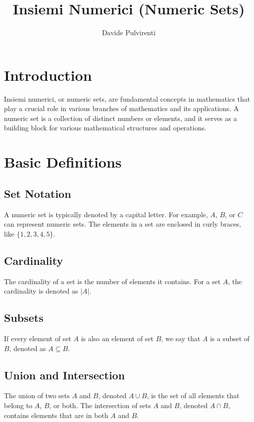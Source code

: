 \documentclass{article}
\title{Insiemi Numerici (Numeric Sets)}
\author{Davide Pulvirenti}
\begin{document}
\maketitle

\tableofcontents

\newpage

\section{Introduction}
Insiemi numerici, or numeric sets, are fundamental concepts in mathematics that play a crucial role in various branches of mathematics and its applications. A numeric set is a collection of distinct numbers or elements, and it serves as a building block for various mathematical structures and operations.

\section{Basic Definitions}
\subsection{Set Notation}
A numeric set is typically denoted by a capital letter. For example, \(A\), \(B\), or \(C\) can represent numeric sets. The elements in a set are enclosed in curly braces, like \(\{1, 2, 3, 4, 5\}\).

\subsection{Cardinality}
The cardinality of a set is the number of elements it contains. For a set \(A\), the cardinality is denoted as \(|A|\).

\subsection{Subsets}
If every element of set \(A\) is also an element of set \(B\), we say that \(A\) is a subset of \(B\), denoted as \(A \subseteq B\).

\subsection{Union and Intersection}
The union of two sets \(A\) and \(B\), denoted \(A \cup B\), is the set of all elements that belong to \(A\), \(B\), or both. The intersection of sets \(A\) and \(B\), denoted \(A \cap B\), contains elements that are in both \(A\) and \(B\).
\end{document}
